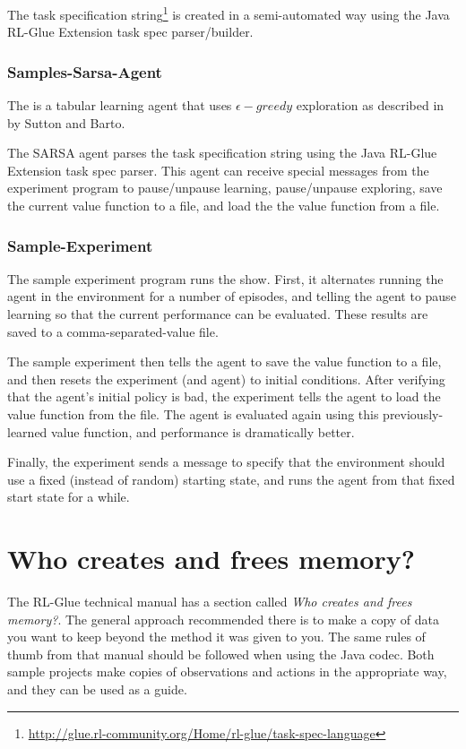 \documentclass[11pt]{article}
\begin{document}
The task specification string\footnote{\url{http://glue.rl-community.org/Home/rl-glue/task-spec-language}} is created in a semi-automated way using the Java RL-Glue Extension task spec parser/builder. 

\subsubsection{Samples-Sarsa-Agent}
\label{sarsa-sample}
The 
is a tabular learning agent that uses $\epsilon-greedy$ exploration as described in  by Sutton and Barto.

The SARSA agent parses the task specification string using the Java RL-Glue Extension task spec parser.  This agent can receive special messages from the experiment program to pause/unpause learning, pause/unpause exploring, save the current value function to a file, and load the the value function from a file.

\subsubsection{Sample-Experiment}
The sample experiment program runs the show.  First, it alternates running the agent in the environment for a number of episodes, and telling the agent to pause learning so that the current performance can be evaluated.  These results are saved to a comma-separated-value file.

The sample experiment then tells the agent to save the value function to a file, and then resets the experiment (and agent) to initial conditions.  After verifying that the agent's initial policy is bad, the experiment tells the agent to load the value function from the file.  The agent is evaluated again using this previously-learned value function, and performance is dramatically better.

Finally, the experiment sends a message to specify that the environment should use a fixed (instead of random) starting state, and runs the agent from that fixed start state for a while.


\section{Who creates and frees memory?}
The RL-Glue technical manual has a section called \textit{Who creates and frees memory?}.  The general approach recommended there is to make a copy of data
you want to keep beyond the method it was given to you.  The same rules of thumb from that manual should be followed when using the Java codec.  Both sample projects make copies of observations and actions in the appropriate way, and they can be used as a guide.
\end{document}
